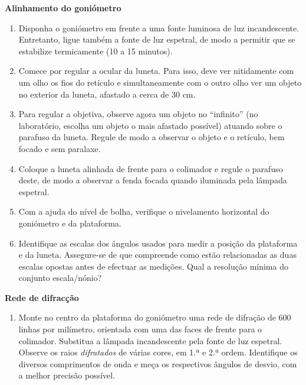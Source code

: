 \documentclass[a4paper,12pt]{article}      %
\begin{document}
\textbf{Alinhamento do goniómetro}
\begin{enumerate}
\item Disponha o goniómetro em frente a uma fonte luminosa de luz incandescente. Entretanto, ligue também a fonte de luz espetral, de modo a permitir que se estabilize termicamente (10 a 15 minutos).
\item Comece por regular a ocular da luneta. Para isso, deve ver nitidamente com um olho  os fios do retículo e simultaneamente com o outro olho ver um objeto no exterior da luneta, afastado a cerca de 30 cm.  
\item Para  regular  a  objetiva,  observe  agora  um  objeto  no  “infinito” (no  laboratório, escolha  um objeto o mais  afastado possível)  atuando  sobre  o  parafuso  da  luneta.  Regule  de  modo  a observar o objeto e o retículo, bem focado e sem paralaxe. 
\item Coloque  a  luneta  alinhada de frente  para o  colimador  e  regule o parafuso deste, de modo a observar a fenda focada quando iluminada pela lâmpada espetral. 
\item Com a ajuda do nível de bolha, verifique o nivelamento horizontal do goniómetro e da plataforma.
\item Identifique as escalas dos ângulos usados para medir a posição da plataforma e da luneta. Assegure-se de que compreende como estão relacionadas as duas escalas opostas antes de efectuar as medições. Qual a resolução mínima do conjunto escala/nónio?
\end{enumerate}

\textbf{Rede de difracção}


\begin{enumerate}[resume]
\item Monte no centro da plataforma do goniómetro uma rede de difração de 600 linhas por milímetro, orientada com uma das faces de frente para o colimador. Substitua a lâmpada incandescente pela fonte de luz espetral. Observe os raios \emph{difratados} de várias cores, em 1.ª e 2.ª ordem. Identifique os diversos comprimentos de onda e meça os respectivos ângulos de desvio, com a melhor precisão possível.
\end{enumerate}
\end{document}
